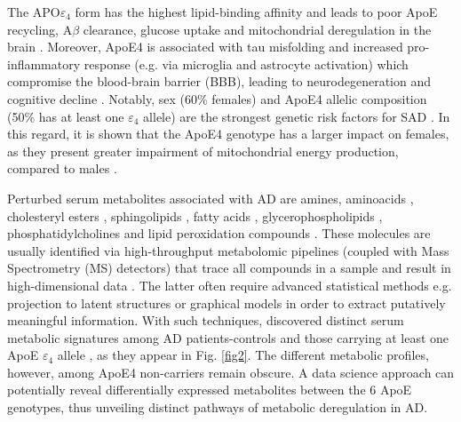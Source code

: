 \documentclass{amsart}
\theoremstyle{plain}
\begin{document}
The APO$\varepsilon_4$ form has the highest lipid-binding affinity and leads to poor ApoE recycling, A$\beta$ clearance, glucose uptake and mitochondrial deregulation in the brain \cite{Husain2021APOETherapeutics}. Moreover, ApoE4 is associated with tau misfolding and increased pro-inflammatory response (e.g. via microglia and astrocyte activation) which compromise the blood-brain barrier (BBB), leading to neurodegeneration and cognitive decline \cite{Parhizkar2022APOEDisease, Husain2021APOETherapeutics}. Notably, sex (60\% females) and ApoE4 allelic composition (50\% has at least one $\varepsilon_4$ allele) are the strongest genetic risk factors for SAD \cite{Husain2021APOETherapeutics, Arnold2020SexMetabolome}. In this regard, it is shown that the ApoE4 genotype has a larger impact on females, as they present greater impairment of mitochondrial energy production, compared to males \cite{Arnold2020SexMetabolome}.

Perturbed serum metabolites associated with AD are amines, aminoacids \cite{deLeeuw2017Blood-basedDisease, Green2023InvestigatingDisease}, cholesteryl esters \cite{Proitsi2017AssociationAnalysis}, sphingolipids \cite{Varma2018BrainStudy,Sun2022AssociationDisease,Green2023InvestigatingDisease,Oeckl2019ADisease,Barupal2019SetsPathophysiology}, fatty acids \cite{Fernandez-Calle2022APOEDiseases,deLeeuw2017Blood-basedDisease}, glycerophospholipids \cite{Varma2018BrainStudy, Jia2022ATypes,Huo2020BrainAnalysis, Weng2019TheImpairment}, phosphatidylcholines \cite{Simpson2016BloodAging} and lipid peroxidation compounds \cite{Fernandez-Calle2022APOEDiseases}. These molecules are usually identified via high-throughput metabolomic pipelines (coupled with Mass Spectrometry (MS) detectors) that trace all compounds in a sample and result in high-dimensional data \cite{Oka2023MultiomicsCohort}. The latter often require advanced statistical methods e.g. projection to latent structures \cite{Weng2019TheImpairment, Peeters2019StableData} or graphical models \cite{Peeters2022Rags2ridges:Matrices} in order to extract putatively meaningful information. 
With such techniques, \citeauthor{deLeeuw2017Blood-basedDisease} discovered distinct serum metabolic signatures among AD patients-controls and those carrying at least one ApoE $\varepsilon_4$ allele \cite{deLeeuw2017Blood-basedDisease}, as they appear in Fig. \ref{fig2}. The different metabolic profiles, however, among ApoE4 non-carriers remain obscure. A data science approach can potentially reveal differentially expressed metabolites between the 6 ApoE genotypes, thus unveiling distinct pathways of metabolic deregulation in AD.
\end{document}
